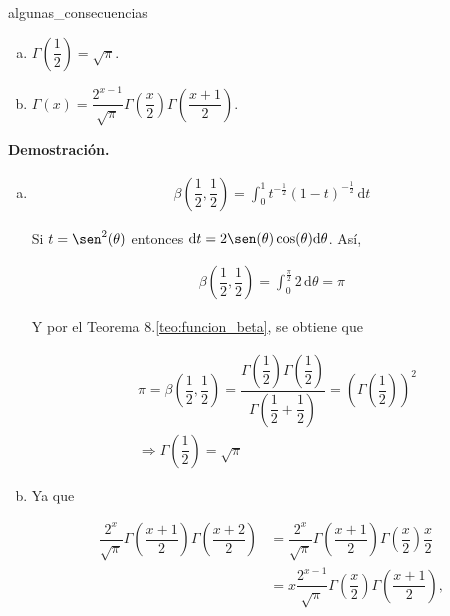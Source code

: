 \documentclass[fleqn]{article}
\newcounter{teore}
\newenvironment{teorema}[2]{\begin{teo}[breakable, pad at break = 5mm, leftrule = 0.7mm, rightrule = 0.7mm, right = 2mm, left = 2mm, enlarge bottom finally by = 3mm, fontupper = \setlength{\parskip}{2mm}, fontlower = \setlength{\parskip}{2mm}]{#1}{#2}}{\end{teo}}
\newcommand{\intg}[4]{\int_{#1}^{#2} \!\! #3 \, \mathrm{d} #4}
\begin{document}
	\begin{teorema}{}{algunas_consecuencias}
		\begin{enumerate}[a)]
			\item $ \Gamma \left( \dfrac{1}{2} \right) = \sqrt{\pi} $.
			\item $ \Gamma(x) = \dfrac{2^{x-1}}{\sqrt{\pi}} \Gamma \left( \dfrac{x}{2} \right) \Gamma \left( \dfrac{x+1}{2} \right) $.
		\end{enumerate}

		\tcblower

		\textbf{Demostración.}

		\begin{enumerate}[a)]
			\item \begin{align*}
				\beta \left( \dfrac{1}{2}, \dfrac{1}{2} \right) = \intg{0}{1}{t^{-\frac{1}{2}} (1-t)^{-\frac{1}{2}}}{t} 
			\end{align*}

			Si $ t = \sen^2 (\theta) $ entonces $ \mathrm{d} t = 2 \sen(\theta) \cos(\theta) \mathrm{d} \theta $. Así,

			\begin{align*}
				\beta \left( \dfrac{1}{2}, \dfrac{1}{2} \right) = \intg{0}{\frac{\pi}{2}}{2}{\theta} = \pi
			\end{align*}

			Y por el Teorema 8.\ref{teo:funcion_beta}, se obtiene que 

			\begin{align*}
				& \pi = \beta \left( \dfrac{1}{2}, \dfrac{1}{2} \right) = \dfrac{\Gamma \left( \dfrac{1}{2} \right) \Gamma \left( \dfrac{1}{2} \right)}{\Gamma\left( \dfrac{1}{2} + \dfrac{1}{2} \right)} = \left( \Gamma \left( \dfrac{1}{2} \right) \right)^2 \\
				& \Longrightarrow \Gamma \left( \dfrac{1}{2} \right) = \sqrt{\pi}
			\end{align*}

			\item Ya que
			
			\begin{align*}
				\dfrac{2^{x}}{\sqrt{\pi}} \Gamma \left( \dfrac{x+1}{2} \right) \Gamma \left( \dfrac{x+2}{2} \right) &= \dfrac{2^{x}}{\sqrt{\pi}} \Gamma \left( \dfrac{x+1}{2} \right) \Gamma \left( \dfrac{x}{2} \right) \dfrac{x}{2} \\
				&= x \dfrac{2^{x-1}}{\sqrt{\pi}} \Gamma \left( \dfrac{x}{2} \right) \Gamma \left( \dfrac{x+1}{2} \right),
			\end{align*}


\end{enumerate}
\end{teorema}
\end{document}
